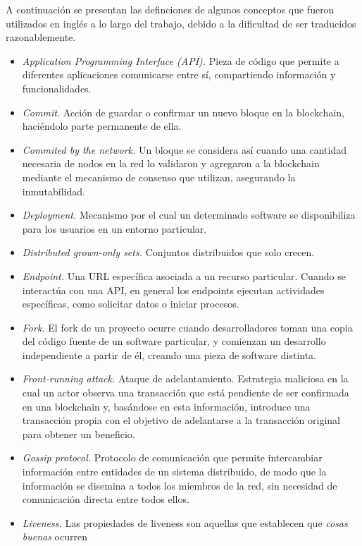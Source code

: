 A continuación se presentan las definciones de algunos conceptos que fueron utilizados
en inglés a lo largo del trabajo, debido a la dificultad de ser traducidos razonablemente.
\begin{itemize}
     \item \textit{Application Programming Interface (API).}  Pieza de código que permite a diferentes
     aplicaciones comunicarse entre sí, compartiendo información y funcionalidades.
     \item \textit{Commit.} Acción de guardar o confirmar un nuevo bloque en la
     blockchain, haciéndolo parte permanente de ella.
     \item \textit{Commited by the network.} Un bloque se considera así cuando una cantidad necesaria de nodos
     en la red lo validaron y agregaron a la blockchain mediante el mecanismo de consenso que utilizan,
     asegurando la inmutabilidad. 
     \item \textit{Deployment.} Mecanismo por el cual un determinado software se disponibiliza para los usuarios
     en un entorno particular.
     \item \textit{Distributed grown-only sets.} Conjuntos distribuidos que solo crecen.
     \item \textit{Endpoint.} Una URL específica asociada a un recurso particular. Cuando se interactúa con una API,
     en general los endpoints ejecutan actividades específicas, como solicitar datos o iniciar procesos.
     \item \textit{Fork.} El fork de un proyecto ocurre cuando desarrolladores toman una copia del código fuente de
     un software particular, y comienzan un desarrollo independiente a partir de él, creando una pieza de software
     distinta.
     \item \textit{Front-running attack.} Ataque de adelantamiento. Estrategia maliciosa en la cual un actor
     observa una transacción que está pendiente de ser confirmada en una blockchain y, basándose en esta
     información, introduce una transacción propia con el objetivo de adelantarse a la transacción
     original para obtener un beneficio.
     \item \textit{Gossip protocol.} Protocolo de comunicación que permite intercambiar información
     entre entidades de un sistema distribuido, de modo que la información se disemina a todos los miembros de la red,
     sin necesidad de comunicación directa entre todos ellos.
     \item \textit{Liveness.} Las propiedades de liveness son aquellas que establecen que \emph{cosas buenas} ocurren

\end{itemize}
